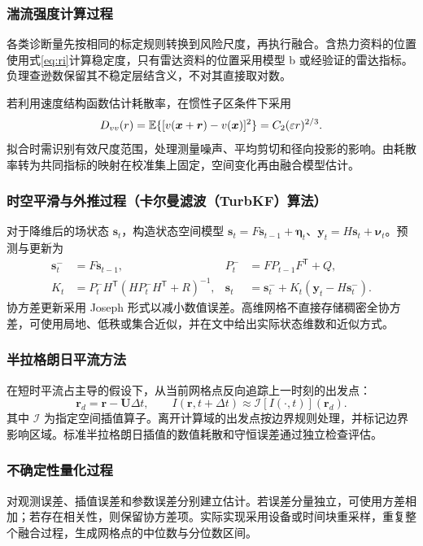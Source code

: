 \subsubsection{湍流强度计算过程}
各类诊断量先按相同的标定规则转换到风险尺度，再执行融合。含热力资料的位置使用式\eqref{eq:ri}计算稳定度，只有雷达资料的位置采用模型 b 或经验证的雷达指标。负理查逊数保留其不稳定层结含义，不对其直接取对数。

若利用速度结构函数估计耗散率，在惯性子区条件下采用
\begin{equation}
D_{vv}(r)=\mathbb{E}\{[v(\bm x+\bm r)-v(\bm x)]^2\}=C_2(\varepsilon r)^{2/3}.
\end{equation}
拟合时需识别有效尺度范围，处理测量噪声、平均剪切和径向投影的影响。由耗散率转为共同指标的映射在校准集上固定，空间变化再由融合模型估计。
\subsubsection{时空平滑与外推过程（卡尔曼滤波（TurbKF）算法）}
对于降维后的场状态 $\bm s_t$，构造状态空间模型 $\bm s_t=F\bm s_{t-1}+\bm\eta_t$、$\bm y_t=H\bm s_t+\bm\nu_t$。预测与更新为
\begin{align}
\bm s_t^-&=F\bm s_{t-1},&P_t^-&=FP_{t-1}F^\mathsf T+Q,\\
K_t&=P_t^-H^\mathsf T(HP_t^-H^\mathsf T+R)^{-1},&
\bm s_t&=\bm s_t^-+K_t(\bm y_t-H\bm s_t^-).
\end{align}
协方差更新采用 Joseph 形式以减小数值误差。高维网格不直接存储稠密全协方差，可使用局地、低秩或集合近似，并在文中给出实际状态维数和近似方式。
\subsubsection{半拉格朗日平流方法}
在短时平流占主导的假设下，从当前网格点反向追踪上一时刻的出发点：
\begin{equation}
\bm r_d=\bm r-\bm U\Delta t,\qquad
I(\bm r,t+\Delta t)\approx\mathcal I[I(\cdot,t)](\bm r_d).
\end{equation}
其中 $\mathcal I$ 为指定空间插值算子。离开计算域的出发点按边界规则处理，并标记边界影响区域。标准半拉格朗日插值的数值耗散和守恒误差通过独立检查评估。
\subsubsection{不确定性量化过程}
对观测误差、插值误差和参数误差分别建立估计。若误差分量独立，可使用方差相加；若存在相关性，则保留协方差项。实际实现采用设备或时间块重采样，重复整个融合过程，生成网格点的中位数与分位数区间。

